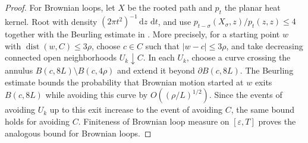 \documentclass[11pt]{article}
\numberwithin{equation}{section}
\newcommand{\1}{\mathbf{1}}
\newcommand{\dd}{\,\mathrm d}
\begin{document}
\begin{proof}
For Brownian loops, let \(X\) be the rooted path and \(p_t\) the planar heat kernel. Root with density \((2\pi t^2)^{-1}\dd z\,\dd t\), and use \(p_{t-\sigma}(X_\sigma,z)/p_t(z,z)\leq 4\) together with the Beurling estimate in \cite[proof of Lemma~5.3]{LawlerTrujillo2007}. More precisely, for a starting point \(w\) with \(\operatorname{dist}(w,C)\leq 3\rho\), choose \(c\in C\) such that \(|w-c|\leq 3\rho\), and take decreasing connected open neighborhoods \(U_k\downarrow C\). In each \(U_k\), choose a curve crossing the annulus \(B(c,8L)\setminus B(c,4\rho)\) and extend it beyond \(\partial B(c,8L)\). The Beurling estimate bounds the probability that Brownian motion started at \(w\) exits \(B(c,8L)\) while avoiding this curve by \(O((\rho/L)^{1/2})\). Since the events of avoiding \(U_k\) up to this exit increase to the event of avoiding \(C\), the same bound holds for avoiding \(C\). Finiteness of Brownian loop measure on \([\varepsilon,T]\) proves the analogous bound for Brownian loops.
\end{proof}
\end{document}
